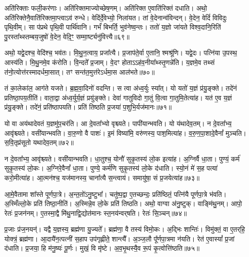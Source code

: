 अति॑रिक्ताः फली॒कर॑णाः।
अति॑रिक्तमाज्योच्छेष॒णम्।
अति॑रिक्त ए॒वाति॑रिक्तं दधाति।
अथो॒ अति॑रिक्तेनै॒वाति॑\-रिक्त\-मा॒प्त्वाऽव॑ रुन्धे।
वेदि॑र्दे॒वेभ्यो॒ निला॑यत।
तां वे॒देनान्व॑विन्दन्।
वे॒देन॒ वेदिं॑ विविदुः पृथि॒वीम्।
सा प॑प्रथे पृथि॒वी पार्थि॑वानि।
गर्भं॑ बिभर्ति॒ भुव॑नेष्व॒न्तः।
ततो॑ य॒ज्ञो जा॑यते विश्व॒दानि॒रिति॑ पु॒रस्ता᳚थ्स्तम्बय॒जुषो॑ वे॒देन॒ वेदि॒ꣳ॒ सम्मा॒र्ष्ट्यनु॑वित्त्यै॥६९॥\ip

अथो॒ यद्वे॒दश्च॒ वेदि॑श्च॒ भव॑तः।
मि॒थु॒न॒त्वाय॒ प्रजा᳚त्यै।
प्र॒जा\-प॑ते॒र्वा ए॒तानि॒ श्मश्रू॑णि।
यद्वे॒दः।
पत्नि॑या उ॒पस्थ॒ आस्य॑ति।
मि॒थु॒नमे॒व क॑रोति।
वि॒न्दते᳚ प्र॒जाम्।
वे॒दꣳ होता\-ऽऽह॑व॒नीया᳚थ्स्तृ॒णन्ने॑ति।
य॒ज्ञमे॒व तथ्सं त॑नो॒त्योत्त॑रस्मादर्ध\-मा॒सात्।
तꣳ सन्त॑त॒मुत्त॑रे\-ऽर्धमा॒स आल॑भते॥७०॥\ip

तं का॒लेका॑ल॒ आग॑ते यजते।
ब्र॒ह्म॒वा॒दिनो॑ वदन्ति।
स त्वा अ॑ध्व॒र्युः स्या᳚त्।
यो यतो॑ य॒ज्ञं प्र॑यु॒ङ्क्ते।
तदे॑नं प्रतिष्ठा॒पय॒तीति॑।
वाता॒द्वा अ॑ध्व॒र्युर्य॒ज्ञं प्रयु॑ङ्क्ते।
देवा॑ गातुविदो गा॒तुं वि॒त्वा गा॒तुमि॒तेत्या॑ह।
यत॑ ए॒व य॒ज्ञं प्र॑यु॒ङ्क्ते।
तदे॑नं॒ प्रति॑\-ष्ठापयति।
प्रति॑ तिष्ठति प्र॒जया॑ प॒शुभि॒र्यज॑मानः॥७१॥\ip{}

यो वा अय॑थादेवतं य॒ज्ञमु॑प॒चर॑ति।
आ दे॒वता᳚भ्यो वृश्च्यते।
पापी॑यान्भवति।
यो य॑थादेव॒तम्।
न दे॒वता᳚भ्य॒ आवृ॑श्च्यते।
वसी॑यान्भवति।
वा॒रु॒णो वै पाशः॑।
इ॒मं विष्या॑मि॒ वरु॑णस्य॒ पाश॒मित्या॑ह।
व॒रु॒ण॒पा॒शादे॒वैनां᳚ मुञ्चति।
स॒वि॒तृप्र॑सूतो यथादेव॒तम्॥७२॥\ip

न दे॒वता᳚भ्य॒ आवृ॑श्च्यते।
वसी॑यान्भवति।
धा॒तुश्च॒ योनौ॑ सुकृ॒तस्य॑ लो॒क इत्या॑ह।
अ॒ग्निर्वै धा॒ता।
पुण्यं॒ कर्म॑ सुकृ॒तस्य॑ लो॒कः।
अ॒ग्निरे॒वैनां᳚ धा॒ता।
पुण्ये॒ कर्म॑णि सुकृ॒तस्य॑ लो॒के द॑धाति।
स्यो॒नं मे॑ स॒ह पत्या॑ करो॒मीत्या॑ह।
आ॒त्मन॑श्च॒ यज॑मानस्य॒ चाना᳚त्यै स॒न्त्वाय॑।
समायु॑षा॒ सं प्र॒जयेत्या॑ह॥७३॥\ip

आ॒\-मे॒वैतामा शा᳚स्ते पूर्णपा॒त्रे।
अ॒न्त॒तो॑\-ऽनु॒ष्टुभा᳚।
चतु॑ष्प॒द्वा ए॒तच्छन्दः॒ प्रति॑\-ष्ठितं॒ पत्नि॑यै पूर्णपा॒त्रे भ॑वति।
अ॒स्मिँल्लो॒के प्रति॑ तिष्ठा॒नीति॑।
अ॒स्मिन्ने॒व लो॒के प्रति॑ तिष्ठति।
अथो॒ वाग्वा अ॑नु॒ष्टुक्।
वाङ्मि॑थु॒नम्।
आपो॒ रेतः॑ प्र॒जन॑नम्।
ए॒तस्मा॒द्वै मि॑थु॒नाद्वि॒द्योत॑मानः स्त॒नय॑न्वर्‌\mbox{}षति।
रेतः॑ सि॒ञ्चन्॥७४॥\ip

प्र॒जाः प्र॑ज॒नयन्॑।
यद्वै य॒ज्ञस्य॒ ब्रह्म॑णा यु॒ज्यते᳚।
ब्रह्म॑णा॒ वै तस्य॑ विमो॒कः।
अ॒द्भिः शान्तिः॑।
विमु॑क्तं॒ वा ए॒तर्‌\mbox{}हि॒ योक्त्रं॒ ब्रह्म॑णा।
आ॒दायै॑न॒त्पत्नी॑ स॒हाप उप॑गृह्णीते॒ शान्त्यै᳚।
अ॒ञ्ज॒लौ पू᳚र्णपा॒त्रमा न॑यति।
रेत॑ ए॒वास्यां᳚ प्र॒जां द॑धाति।
प्र॒जया॒ हि म॑नु॒ष्यः॑ पू॒र्णः।
मुखं॒ वि मृ॑ष्टे।
अ॒व॒भृ॒थस्यै॒व रू॒पं कृ॒त्वोत्ति॑ष्ठति॥७५॥\ip\anuvakamend[स॒वि॒तृप्र॑सूतो यथादेव॒तं प्र॒जयेत्या॑ह सि॒ञ्चन्मृ॑ष्ट॒ एकं॑ च]

